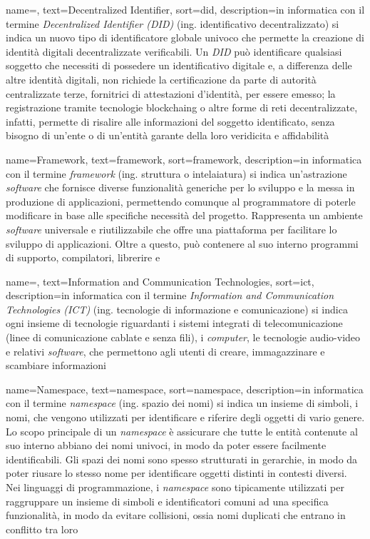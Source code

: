 {
	name=,
	text=Decentralized Identifier,
	sort=did,
	description={in informatica con il termine \emph{Decentralized Identifier (DID)} (ing. identificativo decentralizzato) si indica un nuovo tipo di identificatore globale univoco che permette la creazione di identità digitali decentralizzate verificabili. Un \emph{DID} può identificare qualsiasi soggetto che necessiti di possedere un identificativo digitale e, a differenza delle altre identità digitali, non richiede la certificazione da parte di autorità centralizzate terze, fornitrici di attestazioni d'identità, per essere emesso; la registrazione tramite tecnologie \gls{blockchaing} o altre forme di reti decentralizzate, infatti, permette di risalire alle informazioni del soggetto identificato, senza bisogno di un'ente o di un'entità garante della loro veridicita e affidabilità}
}

{
	name=Framework,
	text=framework,
	sort=framework,
	description={in informatica con il termine \emph{framework} (ing. struttura o intelaiatura) si indica un'astrazione \textit{software} che fornisce diverse funzionalità generiche per lo sviluppo e la messa in produzione di applicazioni, permettendo comunque al programmatore di poterle modificare in base alle specifiche necessità del progetto. Rappresenta un ambiente \textit{software} universale e riutilizzabile che offre una piattaforma per facilitare lo sviluppo di applicazioni. Oltre a questo, può contenere al suo interno programmi di supporto, compilatori, librerire e }
}

{
	name=,
	text=Information and Communication Technologies,
	sort=ict,
	description={in informatica con il termine \emph{Information and Communication Technologies (ICT)} (ing. tecnologie di informazione e comunicazione) si indica ogni insieme di tecnologie riguardanti i sistemi integrati di telecomunicazione (linee di comunicazione cablate e senza fili), i \textit{computer}, le tecnologie audio-video e relativi \textit{software}, che permettono agli utenti di creare, immagazzinare e scambiare informazioni}
}

{
	name=Namespace,
	text=namespace,
	sort=namespace,
	description={in informatica con il termine \emph{namespace} (ing. spazio dei nomi) si indica un insieme di simboli, i nomi, che vengono utilizzati per identificare e riferire degli oggetti di vario genere. Lo scopo principale di un \emph{namespace} è assicurare che tutte le entità contenute al suo interno abbiano dei nomi univoci, in modo da poter essere facilmente identificabili. Gli spazi dei nomi sono spesso strutturati in gerarchie, in modo da poter riusare lo stesso nome per identificare oggetti distinti in contesti diversi.\\
	Nei linguaggi di programmazione, i \emph{namespace} sono tipicamente utilizzati per raggruppare un insieme di simboli e identificatori comuni ad una specifica funzionalità, in modo da evitare collisioni, ossia nomi duplicati che entrano in conflitto tra loro}
}

